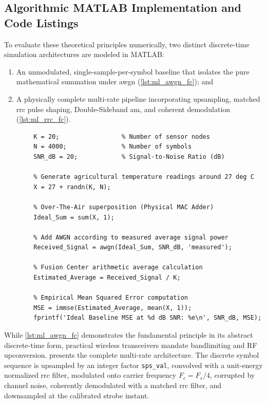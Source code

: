 \documentclass[Markos_Delaportas_1316.tex]{subfiles}
\begin{document}
\subsection{Algorithmic MATLAB Implementation and Code Listings}
\label{subsec:matlab_implementation}
To evaluate these theoretical principles numerically, two distinct
discrete-time simulation architectures are modeled in MATLAB:
\begin{enumerate}
    \item An unmodulated, single-sample-per-symbol baseline that
        isolates the pure mathematical summation under \gls{awgn}
        (\cref{lst:ml_awgn_fc}); and
    \item A physically complete multi-rate pipeline incorporating
        upsampling, matched \gls{rrc} pulse shaping, Double-Sideband
        \gls{am}, and coherent demodulation (\cref{lst:ml_rrc_fc}).
\end{enumerate}

    \begin{lstlisting}[style=Matlab-editor, caption={MATLAB script for ideal unmodulated OTA computation baseline.}, label={lst:ml_awgn_fc}]
        % Ideal OTA Computation Simulation - Unmodulated Baseline
        K = 20;                 % Number of sensor nodes
        N = 4000;               % Number of symbols
        SNR_dB = 20;            % Signal-to-Noise Ratio (dB)

        % Generate agricultural temperature readings around 27 deg C
        X = 27 + randn(K, N);

        % Over-The-Air superposition (Physical MAC Adder)
        Ideal_Sum = sum(X, 1);

        % Add AWGN according to measured average signal power
        Received_Signal = awgn(Ideal_Sum, SNR_dB, 'measured');

        % Fusion Center arithmetic average calculation
        Estimated_Average = Received_Signal / K;

        % Empirical Mean Squared Error computation
        MSE = immse(Estimated_Average, mean(X, 1));
        fprintf('Ideal Baseline MSE at %d dB SNR: %e\n', SNR_dB, MSE);
    \end{lstlisting}

While \cref{lst:ml_awgn_fc} demonstrates the fundamental principle in
its abstract discrete-time form, practical wireless
transceivers mandate bandlimiting and RF upconversion.
 presents the complete multi-rate architecture.
The discrete symbol sequence is upsampled by an integer factor
\texttt{sps\_val}, convolved with a unit-energy normalized
\gls{rrc} filter, modulated onto carrier frequency $F_c = F_s / 4$,
corrupted by channel noise, coherently demodulated with
a matched \gls{rrc} filter, and downsampled at the calibrated strobe instant.
\end{document}
